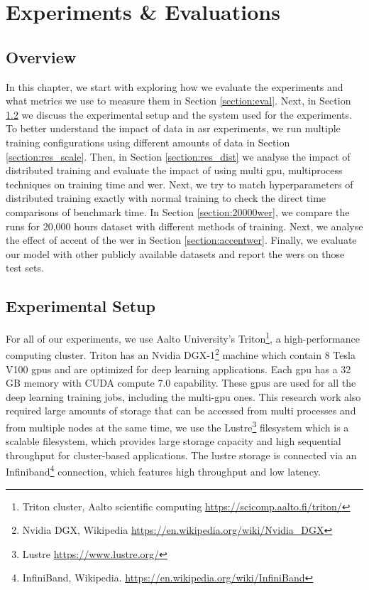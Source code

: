 \chapter{Experiments \& Evaluations}
\label{chapter:evaluation}

\section{Overview}
In this chapter, we start with exploring how we evaluate the experiments and what metrics we use to measure them in Section \ref{section:eval}. Next, in Section \ref{section:trit} we discuss the experimental setup and the system used for the experiments. To better understand the impact of data in \acrshort{asr} experiments, we run multiple training configurations using different amounts of data in Section \ref{section:res_scale}. Then, in Section \ref{section:res_dist} we analyse the impact of distributed training and evaluate the impact of using multi \acrshort{gpu}, multiprocess techniques on training time and \acrshort{wer}. Next, we try to match hyperparameters of distributed training exactly with normal training to check the direct time comparisons of benchmark time. In Section \ref{section:20000wer}, we compare the runs for 20,000 hours dataset with different methods of training. Next, we analyse the effect of accent of the \acrshort{wer} in Section \ref{section:accentwer}. Finally, we evaluate our model with other publicly available datasets and report the \acrshort{wer}s on those test sets.


\section{Experimental Setup}
\label{section:trit}
For all of our experiments, we use Aalto University's Triton\footnote{Triton cluster, Aalto scientific computing \href{https://scicomp.aalto.fi/triton/}{https://scicomp.aalto.fi/triton/}}, a high-performance computing cluster. Triton has an Nvidia DGX-1\footnote{Nvidia DGX, Wikipedia \href{https://en.wikipedia.org/wiki/Nvidia_DGX}{https://en.wikipedia.org/wiki/Nvidia\_DGX}} machine which contain 8 Tesla V100 \acrshort{gpu}s and are optimized for deep learning applications. Each \acrshort{gpu} has a 32 GB memory with CUDA compute 7.0 capability. These \acrshort{gpu}s are used for all the deep learning training jobs, including the multi-\acrshort{gpu} ones. This research work also required large amounts of storage that can be accessed from multi processes and from multiple nodes at the same time, we use the Lustre\footnote{Lustre \href{https://www.lustre.org/}{https://www.lustre.org/}} filesystem which is a scalable filesystem, which provides large storage capacity and high sequential throughput for cluster-based applications. The lustre storage is connected via an Infiniband\footnote{InfiniBand, Wikipedia. \href{https://en.wikipedia.org/wiki/InfiniBand}{https://en.wikipedia.org/wiki/InfiniBand}} connection, which features high throughput and low latency.

